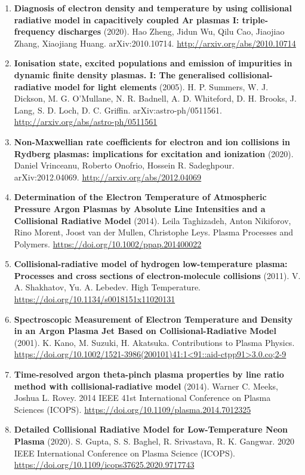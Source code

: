 \documentclass[11pt,a4paper]{article}
\begin{document}
\begin{enumerate}[leftmargin=1.4em]
\item \textbf{Diagnosis of electron density and temperature by using collisional radiative model in capacitively coupled Ar plasmas I: triple-frequency discharges} (2020). Hao Zheng, Jidun Wu, Qilu Cao, Jiaojiao Zhang, Xiaojiang Huang. arXiv:2010.10714. \url{http://arxiv.org/abs/2010.10714}
\item \textbf{Ionisation state, excited populations and emission of impurities in dynamic finite density plasmas. I: The generalised collisional-radiative model for light elements} (2005). H. P. Summers, W. J. Dickson, M. G. O'Mullane, N. R. Badnell, A. D. Whiteford, D. H. Brooks, J. Lang, S. D. Loch, D. C. Griffin. arXiv:astro-ph/0511561. \url{http://arxiv.org/abs/astro-ph/0511561}
\item \textbf{Non-Maxwellian rate coefficients for electron and ion collisions in Rydberg plasmas: implications for excitation and ionization} (2020). Daniel Vrinceanu, Roberto Onofrio, Hossein R. Sadeghpour. arXiv:2012.04069. \url{http://arxiv.org/abs/2012.04069}
\item \textbf{Determination of the Electron Temperature of Atmospheric Pressure Argon Plasmas by Absolute Line Intensities and a Collisional Radiative Model} (2014). Leila Taghizadeh, Anton Nikiforov, Rino Morent, Joost van der Mullen, Christophe Leys. Plasma Processes and Polymers. \url{https://doi.org/10.1002/ppap.201400022}
\item \textbf{Collisional-radiative model of hydrogen low-temperature plasma: Processes and cross sections of electron-molecule collisions} (2011). V. A. Shakhatov, Yu. A. Lebedev. High Temperature. \url{https://doi.org/10.1134/s0018151x11020131}
\item \textbf{Spectroscopic Measurement of Electron Temperature and Density in an Argon Plasma Jet Based on Collisional-Radiative Model} (2001). K. Kano, M. Suzuki, H. Akatsuka. Contributions to Plasma Physics. \url{https://doi.org/10.1002/1521-3986(200101)41:1<91::aid-ctpp91>3.0.co;2-9}
\item \textbf{Time-resolved argon theta-pinch plasma properties by line ratio method with collisional-radiative model} (2014). Warner C. Meeks, Joshua L. Rovey. 2014 IEEE 41st International Conference on Plasma Sciences (ICOPS). \url{https://doi.org/10.1109/plasma.2014.7012325}
\item \textbf{Detailed Collisional Radiative Model for Low-Temperature Neon Plasma} (2020). S. Gupta, S. S. Baghel, R. Srivastava, R. K. Gangwar. 2020 IEEE International Conference on Plasma Science (ICOPS). \url{https://doi.org/10.1109/icops37625.2020.9717743}

\end{enumerate}
\end{document}
